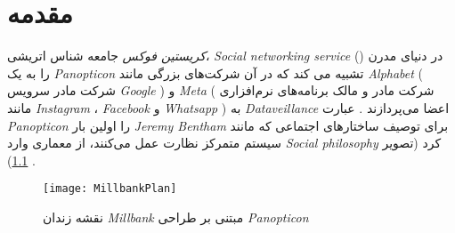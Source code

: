
\chapter{مقدمه}
\ifDataveillance
  \textit{کریستین فوکس}
  جامعه شناس اتریشی،
  \textit{
    \gls{Social networking service}
  }
  \!({})
  در دنیای مدرن را به یک
  \textit{
    \gls{Panopticon}
  }
  تشبیه می کند   که در آن شرکت‌های بزرگی مانند
  \textit{
    \gls{Alphabet}
  }
  \!(
  شرکت مادر سرویس
  \textit{
    \gls{Google}
  }
  \!)
  و
  \textit{
    \gls{Meta}
  }
  \!(
  \!شرکت مادر و مالک برنامه‌های نرم‌افزاری مانند
  \textit{
    \gls{Instagram}
  }،
  \textit{
    \gls{Facebook}
  }
  و
  \textit{
    \gls{Whatsapp}
  }
  \!)
  به
  \textit{
    \gls{Dataveillance}
  }
  اعضا می‌پردازند
  \!\citep{romelePanopticismNotEnough2017a}.
  عبارت
  \textit{
    \gls{Panopticon}
  }
  را اولین بار
  \textit{
    \gls{Jeremy Bentham}
  }
  \!
  \citep{benthamPanopticonInspectionHouseContaining1791}
  برای توصیف ساختار‌های اجتماعی که مانند سیستم متمرکز نظارت عمل می‌کنند، از معماری وارد
  \textit{
    \gls{Social philosophy}
  }
  کرد
  \!(تصویر \ref{fig:MillbankPlan})
  \!\citep{holfordAccountGeneralPenitentiary1828}.
  \begin{figure}[ht]
    \centerline{\texttt{[image: MillbankPlan]}}
    \caption{نقشه زندان \textit{
      \gls{Millbank}
    } مبتنی بر طراحی  \textit{
      \gls{Panopticon}
    }
    }
    \label{fig:MillbankPlan}
  \end{figure}\\

